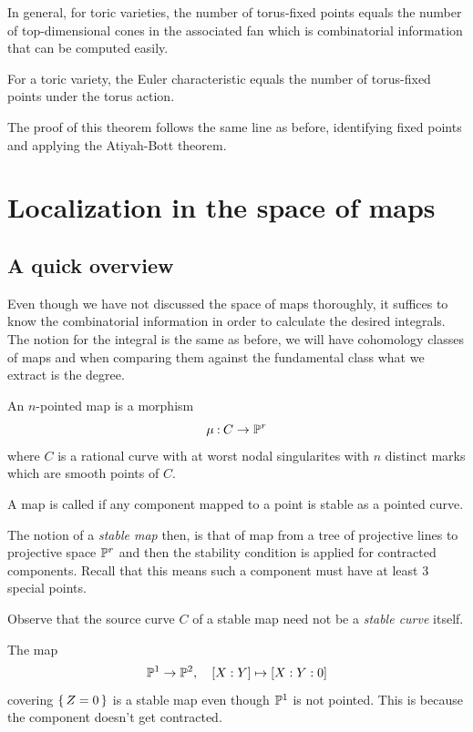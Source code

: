\documentclass[12pt]{memoir}
\begin{document}
In general, for toric varieties, the number of torus-fixed points equals the number of top-dimensional cones in the associated fan which is combinatorial information that can be computed easily.

\begin{Th}
For a toric variety, the Euler characteristic equals the number of torus-fixed points under the torus action.
\end{Th}

The proof of this theorem follows the same line as before, identifying fixed points and applying the Atiyah-Bott theorem. 

\section{Localization in the space of maps}

\subsection{A quick overview}
Even though we have not discussed the space of maps thoroughly, it suffices to know the combinatorial information in order to calculate the desired integrals. The notion for the integral is the same as before, we will have cohomology classes of maps and when comparing them against the fundamental class what we extract is the degree.

\begin{Def}
An $n$-pointed map is a morphism 
$$\mu\mathbin{:} C\to\mathbb{P}^r$$
where $C$ is a rational curve with at worst nodal singularites with $n$ distinct marks which are smooth points of $C$.\par
A map is called  if any component mapped to a point is stable as a pointed curve.    
\end{Def} 

The notion of a \emph{stable map} then, is that of map from a tree of projective lines to projective space $\mathbb{P}^r$ and then the stability condition is applied for contracted components. Recall that this means such a component must have at least 3 special points.

\begin{Rmk}
    Observe that the source curve $C$ of a stable map need not be a \emph{stable curve} itself.
\end{Rmk}

\begin{Ex}
    The map
    $$\mathbb{P}^1\to\mathbb{P}^2,\quad [X:Y]\mapsto[X:Y:0]$$
    covering $\{\,Z=0\,\}$ is a stable map even though $\mathbb{P}^1$ is not pointed. This is because the component doesn't get contracted. 
\end{Ex}
\end{document}
